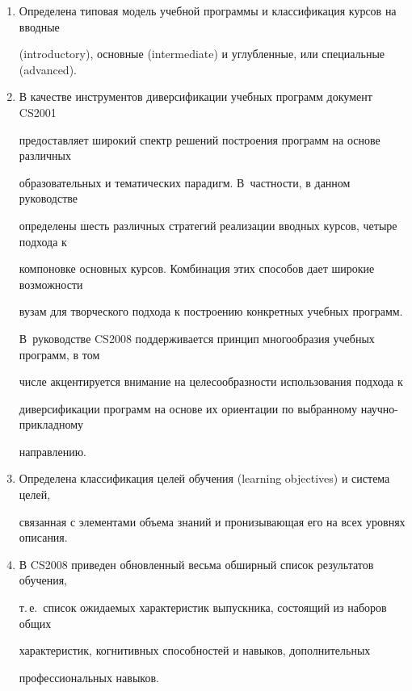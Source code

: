 \begin{enumerate}[1.]
детальное описание обновленного объема знаний (приложение~B), описание некоторых 

новых рекомендованных курсов (приложение~C), дополняющих описания курсов 

документа CS2001.

\item Определена типовая модель учебной программы и классификация курсов на вводные 

(introductory), основные (intermediate) и углубленные, или специальные (advanced).

\item В качестве инструментов диверсификации учебных программ документ CS2001 

предоставляет широкий спектр решений построения программ на основе различных 

образовательных и тематических парадигм. В~част\-ности, в данном руководстве 

определены шесть различных стратегий реализации вводных курсов, четыре подхода к 

компоновке основных курсов. Комбинация этих способов дает широкие возможности 

вузам для творческого подхода к построению конкретных учебных программ. 

В~руководстве CS2008 поддерживается принцип многообразия учебных программ, в том 

числе акцентируется внимание на целесообразности использования подхода к 

диверсификации программ на основе их ориентации по выбранному научно-прикладному 

направлению. 

\item Определена классификация целей обучения (learning objectives) и система целей, 

связанная с элементами объема знаний и пронизывающая его на всех уровнях описания.

\item В CS2008 приведен обновленный весьма обширный список результатов обучения, 

т.\,е.\ список ожидаемых характеристик выпускника, состоящий из наборов общих 

характеристик, когнитивных способностей и навыков, дополнительных 

профессиональных навыков.

\end{enumerate}



